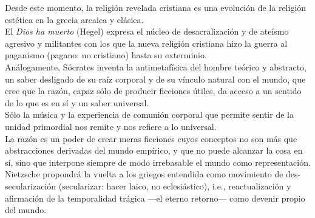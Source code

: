 \documentclass[a4paper, 10pt, twocolumn, spanish]{article}
\begin{document}
Desde este momento, la religión revelada cristiana es una evolución de
la religión estética en la grecia arcaica y clásica.\\[0pt]
El \emph{Dios ha muerto} (Hegel) expresa el núcleo de desacralización y de
ateísmo agresivo y militantes con los que la nueva religión cristiana
hizo la guerra al paganismo (pagano: no cristiano) hasta su
exterminio.\\[0pt]
Análogamente, Sócrates inventa la antimetafísica del hombre teórico y
abstracto, un saber desligado de su raíz corporal y de su vínculo
natural con el mundo, que cree que la razón, capaz sólo de producir
ficciones útiles, da acceso a un sentido de lo que es en sí y un saber
universal.\\[0pt]

Sólo la música y la experiencia de comunión corporal que permite
sentir de la unidad primordial nos remite y nos refiere a lo
universal.\\[0pt]
La razón es un poder de crear meras ficciones cuyos conceptos no son
más que abstracciones derivadas del mundo empírico, y que no puede
alcanzar la cosa en sí, sino que interpone siempre de modo irrebasable
el mundo como representación.\\[0pt]
Nietzsche propondrá la vuelta a los griegos entendida como movimiento
de des-secularización (secularizar: hacer laico, no eclesiástico), i.e.,
reactualización y afirmación de la temporalidad trágica —el eterno
retorno— como devenir propio del mundo.
\end{document}
